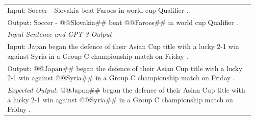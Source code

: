 \documentclass{article}
\begin{document}
\begin{table}[th!]
{\begin{tabular}{l}
Input: Soccer - Slovakia beat Faroes in world cup Qualifier . \\
Output: Soccer - @@Slovakia\#\# beat @@Faroes\#\# in world cup Qualifier . \\\midrule
\textit{Input Sentence and GPT-3 Output} \\
Input: Japan began the defence of their Asian Cup title with a lucky 2-1 win against Syria in a Group C championship match on Friday . \\
Output: @@Japan\#\# began the defence of their Asian Cup title with a lucky 2-1 win against @@Syria\#\# in a Group C championship match on Friday .\\
{\color{blue}\it Expected Output}: @@Japan\#\# began the defence of their Asian Cup title with a lucky 2-1 win against @@Syria\#\# in a Group C championship match on Friday . \\\bottomrule


\end{tabular}}
\end{table}
\end{document}
